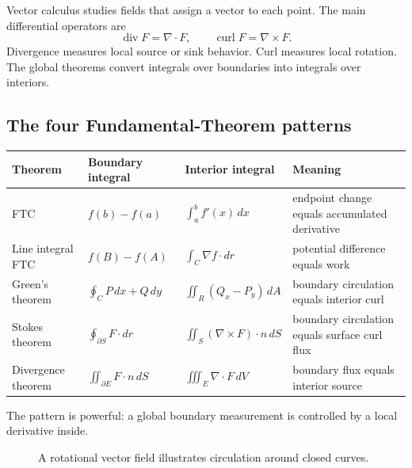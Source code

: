 \documentclass[11pt]{article}
\newcommand{\grad}{\nabla}
\newcommand{\diver}{\operatorname{div}}
\newcommand{\curl}{\operatorname{curl}}
\begin{document}
Vector calculus studies fields that assign a vector to each point. The main differential operators are
\[
\diver F=\grad\cdot F,
\qquad
\curl F=\grad\times F.
\]
Divergence measures local source or sink behavior. Curl measures local rotation. The global theorems convert integrals over boundaries into integrals over interiors.

\subsection*{The four Fundamental-Theorem patterns}

\begin{center}
\renewcommand{\arraystretch}{1.16}
\begin{tabularx}{\textwidth}{p{}p{}p{}X}
\toprule
Theorem & Boundary integral & Interior integral & Meaning\\
\midrule
FTC & $f(b)-f(a)$ & $\int_a^b f'(x)\,dx$ & endpoint change equals accumulated derivative\\
Line integral FTC & $f(B)-f(A)$ & $\int_C\grad f\cdot dr$ & potential difference equals work\\
Green's theorem & $\oint_C P\,dx+Q\,dy$ & $\iint_R(Q_x-P_y)\,dA$ & boundary circulation equals interior curl\\
Stokes theorem & $\oint_{\partial S}F\cdot dr$ & $\iint_S(\grad\times F)\cdot n\,dS$ & boundary circulation equals surface curl flux\\
Divergence theorem & $\iint_{\partial E}F\cdot n\,dS$ & $\iiint_E\grad\cdot F\,dV$ & boundary flux equals interior source\\
\bottomrule
\end{tabularx}
\end{center}
The pattern is powerful: a global boundary measurement is controlled by a local derivative inside.

\begin{figure}[H]
\centering
{}
\caption{A rotational vector field illustrates circulation around closed curves.}
\end{figure}
\end{document}
